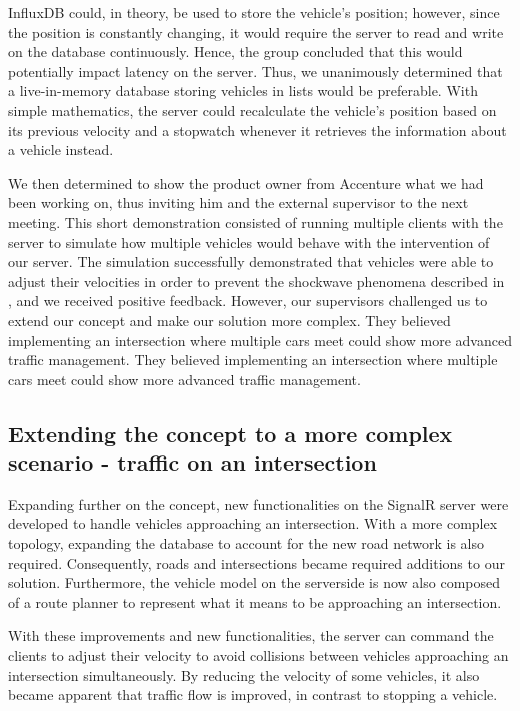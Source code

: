 InfluxDB could, in theory, be used to store the vehicle's position; however, since the position is constantly changing, it would require the server to read and write on the database continuously. Hence, the group concluded that this would potentially impact latency on the server. Thus, we unanimously determined that a live-in-memory database storing vehicles in lists would be preferable. With simple mathematics, the server could recalculate the vehicle's position based on its previous velocity and a stopwatch whenever it retrieves the information about a vehicle instead.

We then determined to show the product owner from Accenture what we had been working on, thus inviting him and the external supervisor to the next meeting. This short demonstration consisted of running multiple clients with the server to simulate how multiple vehicles would behave with the intervention of our server. The simulation successfully demonstrated that vehicles were able to adjust their velocities in order to prevent the shockwave phenomena described in , and we received positive feedback. However, our supervisors challenged us to extend our concept and make our solution more complex. They believed implementing an intersection where multiple cars meet could show more advanced traffic management. They believed implementing an intersection where multiple cars meet could show more advanced traffic management.

\subsection{Extending the concept to a more complex scenario - traffic on an intersection}
Expanding further on the concept, new functionalities on the SignalR server were developed to handle vehicles approaching an intersection. With a more complex topology, expanding the database to account for the new road network is also required. Consequently, roads and intersections became required additions to our solution. Furthermore, the vehicle model on the serverside is now also composed of a route planner to represent what it means to be approaching an intersection.

With these improvements and new functionalities, the server can command the clients to adjust their velocity to avoid collisions between vehicles approaching an intersection simultaneously. By reducing the velocity of some vehicles, it also became apparent that traffic flow is improved, in contrast to stopping a vehicle.